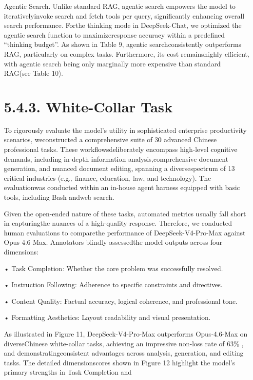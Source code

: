 \documentclass[
  10
]{article}
\begin{document}
Agentic Search. Unlike standard RAG, agentic search empowers the model
to iterativelyinvoke search and fetch tools per query, significantly
enhancing overall search performance. Forthe thinking mode in
DeepSeek-Chat, we optimized the agentic search function to
maximizeresponse accuracy within a predefined ``thinking budget''. As
shown in Table 9, agentic searchconsistently outperforms RAG,
particularly on complex tasks. Furthermore, its cost remainshighly
efficient, with agentic search being only marginally more expensive than
standard RAG(see Table 10).

\section{5.4.3. White-Collar Task}\label{white-collar-task}

To rigorously evaluate the model's utility in sophisticated enterprise
productivity scenarios, weconstructed a comprehensive suite of 30
advanced Chinese professional tasks. These workflowsdeliberately
encompass high-level cognitive demands, including in-depth information
analysis,comprehensive document generation, and nuanced document
editing, spanning a diversespectrum of 13 critical industries (e.g.,
finance, education, law, and technology). The evaluationwas conducted
within an in-house agent harness equipped with basic tools, including
Bash andweb search.

Given the open-ended nature of these tasks, automated metrics usually
fall short in capturingthe nuances of a high-quality response.
Therefore, we conducted human evaluations to comparethe performance of
DeepSeek-V4-Pro-Max against Opus-4.6-Max. Annotators blindly assessedthe
model outputs across four dimensions:

• Task Completion: Whether the core problem was successfully resolved.

• Instruction Following: Adherence to specific constraints and
directives.

• Content Quality: Factual accuracy, logical coherence, and professional
tone.

• Formatting Aesthetics: Layout readability and visual presentation.

As illustrated in Figure 11, DeepSeek-V4-Pro-Max outperforms
Opus-4.6-Max on diverseChinese white-collar tasks, achieving an
impressive non-loss rate of \(6 3 \%\) , and demonstratingconsistent
advantages across analysis, generation, and editing tasks. The detailed
dimensionscores shown in Figure 12 highlight the model's primary
strengths in Task Completion and
\end{document}
